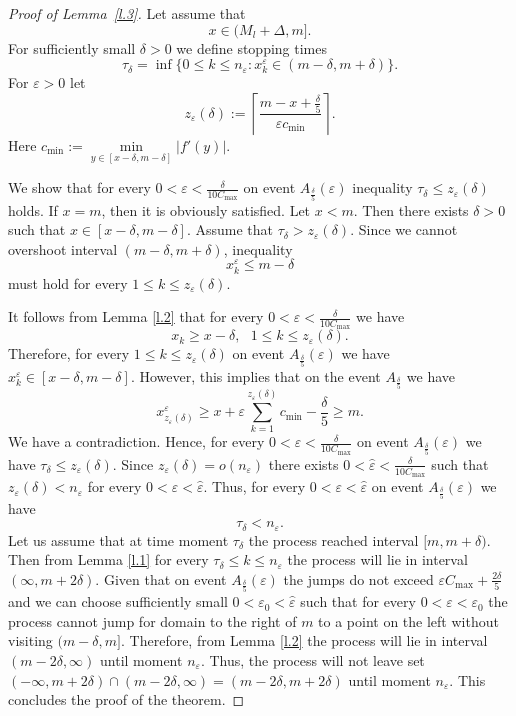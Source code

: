 \documentclass{article}
\theoremstyle{plain}
\theoremstyle{definition}
\theoremstyle{remark}
\newcommand{\beq}{\begin{equation}}
\newcommand{\eeq}{\end{equation}}
\begin{document}
\begin{proof}[Proof of Lemma~\ref{l.3}]
Let assume that 
\beq\label{l.3.1}x\in(M_{l}+\Delta,m].
\eeq  
For sufficiently small $\delta>0$ we define stopping times
$$
\tau_\delta=\inf\{0 \leqslant k \leqslant n_\varepsilon:x_k^{\varepsilon}\in (m-\delta,m+\delta)\}.
$$
For $\varepsilon>0$ let
$$
z_\varepsilon(\delta):=\left\lceil\frac{m-x+\frac{\delta}{5}}{\varepsilon c_{\min}}\right\rceil.
$$
Here $c_{\min}:=\min\limits_{y\in[x-\delta,m - \delta]}|f'(y)|$.

We show that for every $0<\varepsilon<\frac{\delta}{10 C_{\max}}$ on event $A_{\frac{\delta}{5}}\left(\varepsilon\right)$
inequality $\tau_\delta\leqslant z_\varepsilon(\delta)$ holds. If $x = m$, then it is obviously satisfied. Let $ x < m$. Then there exists $\delta > 0$ such that $x \in [x - \delta, m - \delta]$. Assume that $\tau_\delta > z_\varepsilon(\delta)$.
Since we cannot overshoot interval $(m-\delta,m+\delta)$,
inequality
$$
x_k^{\varepsilon}\leqslant m-\delta
$$
must hold for every $1\leqslant k \leqslant z_\varepsilon(\delta)$.

It follows from Lemma \ref{l.2} that for every $0<\varepsilon<\frac{\delta}{10 C_{\max}}$ we have
$$
x_k\geqslant x-\delta,\ \ \ 1\leqslant k \leqslant z_\varepsilon(\delta).
$$
Therefore, for every $1\leqslant k \leqslant z_\varepsilon(\delta)$ on event $A_{\frac{\delta}{5}}\left(\varepsilon\right)$ we have $x_k^{\varepsilon}\in[x-\delta,m-\delta]$. However, this implies that on the event $ A_{\frac{\delta}{5}}$
we have
$$
x_{z_\varepsilon(\delta)}^{\varepsilon} \geqslant x +\varepsilon \sum\limits_{k=1}^{z_\varepsilon(\delta)} c_{\min}-\frac{\delta}{5} \geqslant m.
$$
We have a contradiction. Hence, for every $0<\varepsilon<\frac{\delta}{10 C_{\max}}$ on event $A_{\frac{\delta}{5}}\left(\varepsilon\right)$ we have $\tau_\delta\leqslant z_\varepsilon(\delta)$. Since $z_\varepsilon(\delta) = o\left(n_{\varepsilon}\right)$ there exists $0<\hat{\varepsilon}<\frac{\delta}{10 C_{\max}}$ such that $z_\varepsilon(\delta) < n_{\varepsilon}$ for every $0<\varepsilon<\hat{\varepsilon}$. Thus, for every $0<\varepsilon<\hat{\varepsilon}$ on event $A_{\frac{\delta}{5}}\left(\varepsilon\right)$ we have
\beq\label{24.10.1}
\tau_\delta < n_\varepsilon.
\eeq
Let us assume that at time moment $\tau_\delta$ the process reached interval $[m,m+\delta)$. Then from Lemma \ref{l.1} for every $\tau_\delta \leqslant k \leqslant n_{\varepsilon}$ the process will lie in interval $(\infty,m+2\delta)$. Given that on event $A_{\frac{\delta}{5}}\left(\varepsilon\right)$ the jumps do not exceed $\varepsilon C_{\max}+\frac{2\delta}{5}$ and we can choose sufficiently small $0 < \varepsilon_0 < \hat{\varepsilon}$ such that for every $0 < \varepsilon < \varepsilon_0$ the process cannot jump for domain to the right of $m$ to a point on the left without visiting $(m-\delta,m]$. Therefore, from Lemma \ref{l.2} the process will lie in interval $(m-2\delta,\infty)$ until moment $n_{\varepsilon}$. Thus, the process will not leave set
$(-\infty,m+2\delta)\cap(m-2\delta,\infty)=(m-2\delta,m+2\delta)$ until moment $n_{\varepsilon}$. This concludes the proof of the theorem.
\end{proof}
\end{document}
